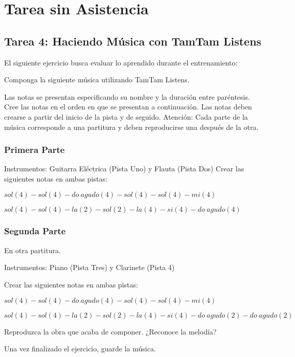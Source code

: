 \section{Tarea sin Asistencia}

\subsection{Tarea 4: Haciendo M\'usica con TamTam Listens}

El siguiente ejercicio busca evaluar lo aprendido durante el entrenamiento:

Componga la siguiente m\'usica utilizando TamTam Listens.

Las notas se presentan especificando su nombre y la duraci\'on entre par\'entesis.
Cree las notas en el orden en que se presentan a continuaci\'on.
Las notas deben crearse a partir del inicio de la pista y de seguido.
Atenci\'on: Cada parte de la m\'usica corresponde a una partitura y deben reproducirse una despu\'es de la otra.

\subsubsection{Primera Parte}
Instrumentos: Guitarra El\'ectrica (Pista Uno) y Flauta (Pista Dos)
Crear las siguientes notas en ambas pistas:

$sol (4) - sol (4) - do\:agudo (4) - sol (4) - sol (4) - mi (4)$

$sol (4)  - sol (4) - la (2) - sol (2) - la (4) - si (4) - do\:agudo (4)$

\subsubsection{Segunda Parte}
En otra partitura.

Instrumentos: Piano (Pista Tres) y Clarinete (Pista 4)

Crear las siguientes notas en ambas pistas:

$sol (4) - sol (4) - do\:agudo (4) - sol (4) - sol (4) - mi (4)$

$sol (4)  - sol (4) - la (2) - sol (2) - la (4) - si (4) - do\:agudo (2) - do\:agudo (2)$

Reproduzca la obra que acaba de componer. ¿Reconoce la melod\'ia?

Una vez finalizado el ejercicio, guarde la m\'usica. 
